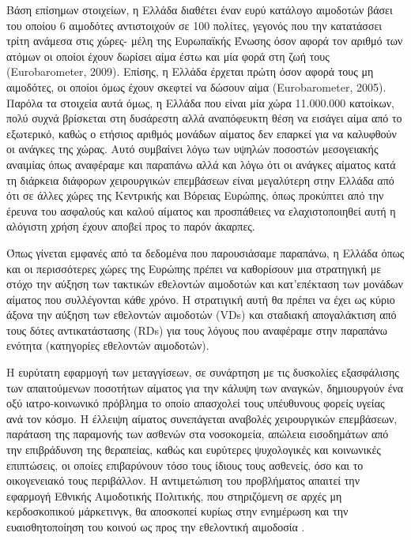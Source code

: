 		Βάση επίσημων στοιχείων, η Ελλάδα διαθέτει έναν ευρύ κατάλογο αιμοδοτών βάσει του οποίου 6 αιμοδότες αντιστοιχούν σε 100 πολίτες, γεγονός που την κατατάσσει τρίτη ανάμεσα στις χώρες- μέλη της Ευρωπαϊκής Ένωσης όσον αφορά τον αριθμό των ατόμων οι οποίοι έχουν δωρίσει αίμα έστω και μία φορά στη ζωή τους  (Eurobarometer, 2009).  Επίσης, η Ελλάδα έρχεται πρώτη όσον αφορά τους μη αιμοδότες, οι οποίοι όμως έχουν σκεφτεί να δώσουν αίμα (Eurobarometer, 2005). Παρόλα τα στοιχεία αυτά όμως, η Ελλάδα που είναι μία χώρα 11.000.000 κατοίκων, πολύ συχνά βρίσκεται στη δυσάρεστη αλλά αναπόφευκτη θέση να εισάγει αίμα από το εξωτερικό, καθώς ο ετήσιος αριθμός μονάδων αίματος δεν επαρκεί για να καλυφθούν οι ανάγκες της χώρας. Αυτό συμβαίνει λόγω των υψηλών ποσοστών μεσογειακής αναιμίας όπως αναφέραμε και παραπάνω αλλά και λόγω ότι οι ανάγκες αίματος κατά τη διάρκεια διάφορων χειρουργικών επεμβάσεων είναι μεγαλύτερη στην Ελλάδα από ότι σε άλλες χώρες της Κεντρικής και Βόρειας Ευρώπης, όπως προκύπτει από την έρευνα του ασφαλούς και
καλού αίματος \cite{Grindon1996} και προσπάθειες να ελαχιστοποιηθεί αυτή η αλόγιστη χρήση έχουν αποβεί προς το παρόν άκαρπες. 

Όπως γίνεται εμφανές από τα δεδομένα που παρουσιάσαμε παραπάνω, η Ελλάδα όπως και οι περισσότερες χώρες της Ευρώπης πρέπει να καθορίσουν μια στρατηγική με στόχο την αύξηση των τακτικών εθελοντών αιμοδοτών και κατ'επέκταση των μονάδων αίματος που συλλέγονται κάθε χρόνο. Η στρατιγική αυτή θα πρέπει να έχει ως κύριο άξονα την αύξηση των εθελοντών αιμοδοτών (VDs) και σταδιακή απογαλάκτιση από τους δότες αντικατάστασης (RDs) για τους λόγους που αναφέραμε στην παραπάνω ενότητα (κατηγορίες εθελοντών αιμοδοτών).

Η ευρύτατη εφαρμογή των μεταγγίσεων, σε συνάρτηση με τις δυσκολίες εξασφάλισης των απαιτούμενων ποσοτήτων αίματος για την κάλυψη των αναγκών, δημιουργούν ένα οξύ ιατρο-κοινωνικό πρόβλημα το οποίο απασχολεί τους υπέυθυνους φορείς υγείας ανά τον κόσμο. Η έλλειψη αίματος συνεπάγεται αναβολές χειρουργικών επεμβάσεων, παράταση της παραμονής των ασθενών στα νοσοκομεία, απώλεια εισοδημάτων από την επιβράδυνση της θεραπείας, καθώς και ευρύτερες ψυχολογικές και κοινωνικές επιπτώσεις, οι οποίες επιβαρύνουν τόσο τους ίδιους τους ασθενείς, όσο και το οικογενειακό τους περιβάλλον. Η αντιμετώπιση του προβλήματος απαιτεί την εφαρμογή Εθνικής Αιμοδοτικής Πολιτικής, που στηριζόμενη σε αρχές μη κερδοσκοπικού μάρκετινγκ, θα αποσκοπεί κυρίως στην ενημέρωση και την ευαισθητοποίηση του κοινού ως προς την εθελοντική αιμοδοσία \cite{Politis} \cite{Marantidou2007}.


